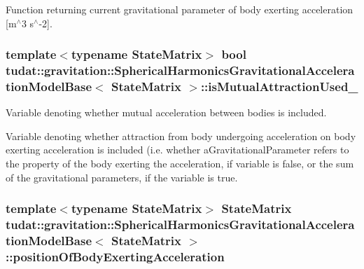 Function returning current gravitational parameter of body exerting acceleration \mbox{[}m$^\wedge$3 s$^\wedge$-\/2\mbox{]}. 
\subsubsection[{\texorpdfstring{is\+Mutual\+Attraction\+Used\+\_\+}{isMutualAttractionUsed_}}]{\setlength{\rightskip}{0pt plus 5cm}template$<$typename State\+Matrix$>$ bool {\bf tudat\+::gravitation\+::\+Spherical\+Harmonics\+Gravitational\+Acceleration\+Model\+Base}$<$ State\+Matrix $>$\+::is\+Mutual\+Attraction\+Used\+\_\+\hspace{0.3cm}{\ttfamily [protected]}}\hypertarget{classtudat_1_1gravitation_1_1SphericalHarmonicsGravitationalAccelerationModelBase_a103da0d449d50376af758f527bbe5131}{}\label{classtudat_1_1gravitation_1_1SphericalHarmonicsGravitationalAccelerationModelBase_a103da0d449d50376af758f527bbe5131}


Variable denoting whether mutual acceleration between bodies is included. 

Variable denoting whether attraction from body undergoing acceleration on body exerting acceleration is included (i.\+e. whether a\+Gravitational\+Parameter refers to the property of the body exerting the acceleration, if variable is false, or the sum of the gravitational parameters, if the variable is true. 
\subsubsection[{\texorpdfstring{position\+Of\+Body\+Exerting\+Acceleration}{positionOfBodyExertingAcceleration}}]{\setlength{\rightskip}{0pt plus 5cm}template$<$typename State\+Matrix$>$ State\+Matrix {\bf tudat\+::gravitation\+::\+Spherical\+Harmonics\+Gravitational\+Acceleration\+Model\+Base}$<$ State\+Matrix $>$\+::position\+Of\+Body\+Exerting\+Acceleration\hspace{0.3cm}{\ttfamily [protected]}}\hypertarget{classtudat_1_1gravitation_1_1SphericalHarmonicsGravitationalAccelerationModelBase_a7025348306abb91a3dd47a8583518de8}{}\label{classtudat_1_1gravitation_1_1SphericalHarmonicsGravitationalAccelerationModelBase_a7025348306abb91a3dd47a8583518de8}


